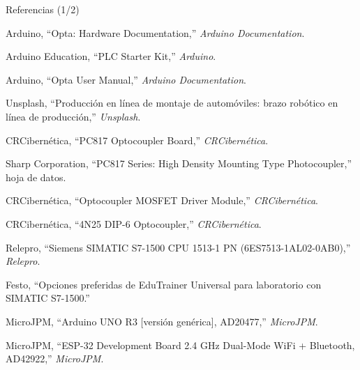 \documentclass[aspectratio=169,11pt]{beamer}
\begin{document}
\begin{frame}{Referencias (1/2)}
    \scriptsize
    \begin{description}\setlength{\itemsep}{1pt}
        \item[{[1]}] Arduino, ``Opta: Hardware Documentation,'' \emph{Arduino Documentation}.
        \item[{[2]}] Arduino Education, ``PLC Starter Kit,'' \emph{Arduino}.
        \item[{[8]}] Arduino, ``Opta User Manual,'' \emph{Arduino Documentation}.
        \item[{[9]}] Unsplash, ``Producción en línea de montaje de automóviles: brazo robótico en línea de producción,'' \emph{Unsplash}.
        \item[{[13]}] CRCibernética, ``PC817 Optocoupler Board,'' \emph{CRCibernética}.
        \item[{[14]}] Sharp Corporation, ``PC817 Series: High Density Mounting Type Photocoupler,'' hoja de datos.
        \item[{[15]}] CRCibernética, ``Optocoupler MOSFET Driver Module,'' \emph{CRCibernética}.
        \item[{[16]}] CRCibernética, ``4N25 DIP-6 Optocoupler,'' \emph{CRCibernética}.
        \item[{[17]}] Relepro, ``Siemens SIMATIC S7-1500 CPU 1513-1 PN (6ES7513-1AL02-0AB0),'' \emph{Relepro}.
        \item[{[18]}] Festo, ``Opciones preferidas de EduTrainer Universal para laboratorio con SIMATIC S7-1500.''
        \item[{[19]}] MicroJPM, ``Arduino UNO R3 [versión genérica], AD20477,'' \emph{MicroJPM}.
        \item[{[20]}] MicroJPM, ``ESP-32 Development Board 2.4 GHz Dual-Mode WiFi + Bluetooth, AD42922,'' \emph{MicroJPM}.
    \end{description}
\end{frame}
\end{document}
